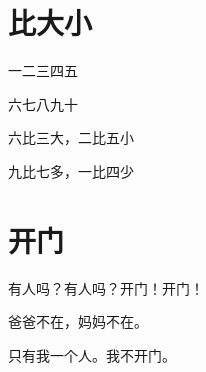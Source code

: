 \documentclass[12pt,UTF-8,openany]{ctexbook}
\begin{document}
\chapter{比大小}

\begin{large}
    
    一二三四五
    
    六七八九十
    
    六比三大，二比五小
    
    九比七多，一比四少
    
\end{large}


\clearpage

\begin{center}
    
\end{center}


\hanzibox{}\hanzibox{}\hanzibox{}\hanzibox{}\hspace{1em}\hanzibox{}\hanzibox{}\hanzibox{}\hanzibox{}

\hanzibox{}\hanzibox{}\hanzibox{}\hanzibox{}\hspace{1em}\hanzibox{}\hanzibox{}\hanzibox{}\hanzibox{}

\hanzibox{}\hanzibox{}\hanzibox{}\hanzibox{}\hspace{1em}\hanzibox{}\hanzibox{}\hanzibox{}\hanzibox{}

\hanzibox{}\hanzibox{}\hanzibox{}\hanzibox{}\hspace{1em}\hanzibox{}\hanzibox{}\hanzibox{}\hanzibox{}






\chapter{开门}

\begin{large}
    
    有人吗？有人吗？开门！开门！
    
    爸爸不在，妈妈不在。
    
    只有我一个人。我不开门。
    
\end{large}


\clearpage
\end{document}
